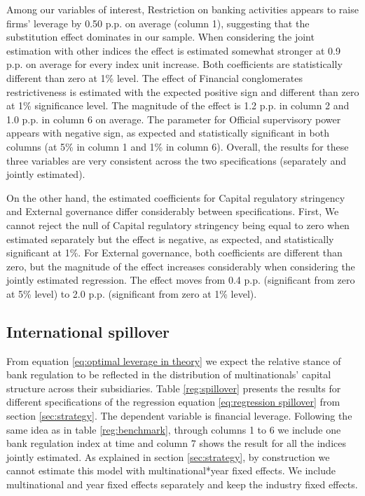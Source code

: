 \documentclass[12pt]{article}
\begin{document}
	  Among our variables of interest, Restriction on banking activities appears to raise firms' leverage by 0.50 p.p. on average (column 1), suggesting that the substitution effect dominates in our sample. When considering the joint estimation with other indices the effect is estimated somewhat stronger at 0.9 p.p. on average for every index unit increase. Both coefficients are statistically different than zero at 1\% level. The effect of Financial conglomerates restrictiveness is estimated with the expected positive sign and different than zero at 1\% significance level. The magnitude of the effect is 1.2 p.p. in column 2 and 1.0 p.p. in column 6 on average. The parameter for Official supervisory power appears with negative sign, as expected and statistically significant in both columns (at 5\% in column 1 and 1\% in column 6). Overall, the results for these three variables are very consistent across the two specifications (separately and jointly estimated). 
	  
	  On the other hand, the estimated coefficients for Capital regulatory stringency and External governance differ considerably between specifications. First, We cannot reject the null of Capital regulatory stringency being equal to zero when estimated separately but the effect is negative, as expected, and statistically significant at 1\%. For External governance, both coefficients are different than zero, but the magnitude of the effect increases considerably when considering the jointly estimated regression. The effect moves from 0.4 p.p. (significant from zero at 5\% level) to 2.0 p.p. (significant from zero at 1\% level).    
	   	    
 	\subsection{International spillover} \label{sec:spillover}
 
 From equation \ref{eq:optimal leverage in theory} we expect the relative stance of bank regulation to be reflected in the distribution of multinationals' capital structure across their subsidiaries. Table \ref{reg:spillover} presents the results for different specifications of the regression equation \ref{eq:regression spillover} from section \ref{sec:strategy}. The dependent variable is financial leverage. Following the same idea as in table \ref{reg:benchmark}, through columns 1 to 6 we include one bank regulation index at time and column 7 shows the result for all the indices jointly estimated. As explained in section \ref{sec:strategy}, by construction we cannot estimate this model with multinational*year fixed effects. We include multinational and year fixed effects separately and keep the industry fixed effects. 
 
\end{document}
